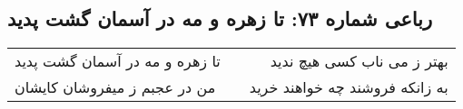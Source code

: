 \begin{center}
\section*{رباعی شماره ۷۳: تا زهره و مه در آسمان گشت پدید}
\label{sec:sh073}
\begin{longtable}{l p{0.5cm} r}
تا زهره و مه در آسمان گشت پدید
&&
بهتر ز می ناب کسی هیچ ندید
\\
من در عجبم ز میفروشان کایشان
&&
به زانکه فروشند چه خواهند خرید
\\
\end{longtable}
\end{center}
